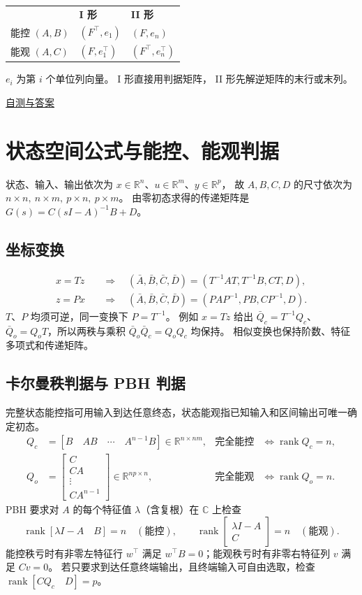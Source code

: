 \documentclass[UTF8,a4paper,12pt,fontset=fandol]{ctexart}
\DeclareMathOperator{\rank}{rank}
\begin{document}
\begin{keybox}
\centering
\renewcommand{\arraystretch}{1.18}
\begin{tabular}{@{}lll@{}}
 & \textbf{I 形} & \textbf{II 形} \\
能控 $(A,B)$ & $(F^\top,e_1)$ & $(F,e_n)$ \\
能观 $(A,C)$ & $(F,e_1^\top)$ & $(F^\top,e_n^\top)$
\end{tabular}\par
\smallskip
$e_i$ 为第 $i$ 个单位列向量。 I 形直接用判据矩阵， II 形先解逆矩阵的末行或末列。
\end{keybox}

\hfill\hyperref[sec:practice]{自测与答案}

\newpage
\section{状态空间公式与能控、能观判据}\label{sec:tests}
状态、输入、输出依次为 $x\in\mathbb R^n$、$u\in\mathbb R^m$、$y\in\mathbb R^p$，
故 $A,B,C,D$ 的尺寸依次为 $n\times n,\ n\times m,\ p\times n,\ p\times m$。
由零初态求得的传递矩阵是 $G(s)=C(sI-A)^{-1}B+D$。

\subsection*{坐标变换}
\[
\begin{aligned}
 x=Tz&\quad\Longrightarrow\quad(\bar A,\bar B,\bar C,\bar D)=(T^{-1}AT,T^{-1}B,CT,D),\\
 z=Px&\quad\Longrightarrow\quad(\bar A,\bar B,\bar C,\bar D)=(PAP^{-1},PB,CP^{-1},D).
\end{aligned}
\]
$T$、$P$ 均须可逆，同一变换下 $P=T^{-1}$。
例如 $x=Tz$ 给出 $\bar Q_c=T^{-1}Q_c$、$\bar Q_o=Q_oT$，所以两秩与乘积 $\bar Q_o\bar Q_c=Q_oQ_c$ 均保持。
相似变换也保持阶数、特征多项式和传递矩阵。

\subsection*{卡尔曼秩判据与 PBH 判据}
完整状态能控指可用输入到达任意终态，状态能观指已知输入和区间输出可唯一确定初态。
\[
\begin{aligned}
 Q_c&=[B\quad AB\quad\cdots\quad A^{n-1}B]\in\mathbb R^{n\times nm},
 &\text{完全能控}&\iff\rank Q_c=n,\\
 Q_o&=\left[\begin{smallmatrix}C\\CA\\\vdots\\CA^{n-1}\end{smallmatrix}\right]\in\mathbb R^{np\times n},
 &\text{完全能观}&\iff\rank Q_o=n.
\end{aligned}
\]
PBH 要求对 $A$ 的每个特征值 $\lambda$（含复根）在 $\mathbb C$ 上检查
\[
 \rank[\lambda I-A\quad B]=n\quad(\text{能控}),\qquad
 \rank\begin{bmatrix}\lambda I-A\\ C\end{bmatrix}=n\quad(\text{能观}).
\]
能控秩亏时有非零左特征行 $w^\top$ 满足 $w^\top B=0$；能观秩亏时有非零右特征列 $v$ 满足 $Cv=0$。
若只要求到达任意终端输出，且终端输入可自由选取，检查 $\rank[CQ_c\quad D]=p$。
\end{document}
